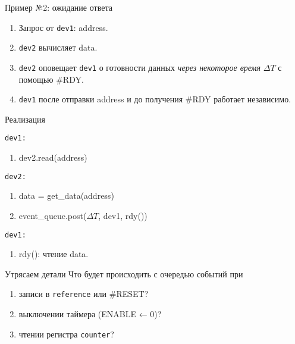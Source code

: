 \documentclass{beamer}
\begin{document}
\begin{frame}{Пример №2: ожидание ответа}

\begin{center}
                 \end{center}

\begin{enumerate}
    \item Запрос от \texttt{dev1}: address.
    \item \texttt{dev2} вычисляет data.
    \item \texttt{dev2} оповещает \texttt{dev1} о готовности данных \textit{через некоторое время} $\Delta T$ с помощью \#RDY.
    \item \texttt{dev1} после отправки address и до получения \#RDY работает независимо.
\end{enumerate}

\end{frame}

\begin{frame}{Реализация}

\texttt{dev1:}
\begin{enumerate}
    \item dev2.read(address)
\end{enumerate}
\texttt{dev2:}
\begin{enumerate}
    \item data = get_data(address)
    \item event_queue.post($\Delta T$, dev1, rdy())
\end{enumerate}
\texttt{dev1:}
\begin{enumerate}
    \item rdy(): чтение data.
\end{enumerate}

\end{frame}

\begin{frame}{Утрясаем детали}
Что будет происходить с очередью событий при 
\begin{enumerate}
    \item записи в \texttt{reference} или \#RESET?
    \item выключении таймера (ENABLE ← 0)?
    \item чтении регистра \texttt{counter}?
\end{enumerate}

\end{frame}
\end{document}
